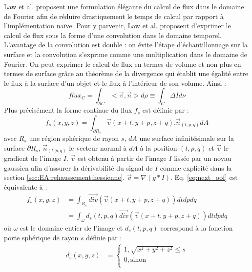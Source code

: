    Law et al. \cite{Law2009_efficient_implementation} proposent une formulation élégante du calcul de flux dans le domaine de Fourier afin de réduire drastiquement le temps de calcul par rapport à l'implémentation naïve.
  Pour y parvenir, Law et al. proposent d'exprimer le calcul de flux sous la forme d'une convolution dans le domaine temporel. L'avantage de la convolution est double : on évite l'étape d'échantillonnage sur la surface et la convolution s'exprime comme une multiplication dans le domaine de Fourier. On peut exprimer le calcul de flux en termes de volume et non plus en termes de surface grâce au théorème de la divergence qui établit une égalité entre le flux à la surface d'un objet et le flux à l'intérieur de son volume. Ainsi :
  \begin{equation}
    flux_{C} = \int_{\partial C}< \vec{v},\vec{n} > d\rho \equiv \int_{C }\Delta I d\nu
  \end{equation}
  Plus précisément la forme continue du flux $f_s$ est définie par :
  \begin{equation}
    f_s(x,y,z) = \int_{\partial R_s}\vec{v}(x+t,y+p, z+q) . \vec{n}_{(t,p,q)}dA
    \label{eq:next_oof}
  \end{equation}
  avec $R_s$ une région sphérique de rayon $s$, $dA$ une surface infinitésimale sur la surface $\partial R_s$, $\vec{n}_{(t,p,q)}$ le vecteur normal à $dA$ à la position $(t,p,q)$ et $\vec{v}$ le gradient de l'image $I$. $\vec{v}$ est obtenu à partir de l'image $I$ lissée par un noyau gaussien afin d'assurer la dérivabilité du signal de $I$ comme explicité dans la section \ref{sec:EA:rehaussement:hessienne}. $\vec{v}=\nabla(g*I)$.
  Eq. \ref{eq:next_oof} est équivalente à :
  \begin{align}
    f_s(x,y,z) & = \int_{R_s} \vec{div}( \vec{v}(x+t,y+p, z+q) ) dtdpdq \\
    \nonumber
    & = \int_{\omega} d_s(t,p,q) \vec{div}( \vec{v}(x+t,y+p, z+q) ) dtdpdq
  \end{align}
  où $\omega$ est le domaine entier de l'image et $d_s(t,p,q)$ correspond à la fonction porte sphérique de rayon $s$ définie par :
  \begin{align}
    d_s(x,y,z) & = \begin{cases} 
                  1, \sqrt{x^2 + y^2 + z^2} \leq s  \\
                  0, \text{sinon} \\
                \end{cases}
  \end{align}
